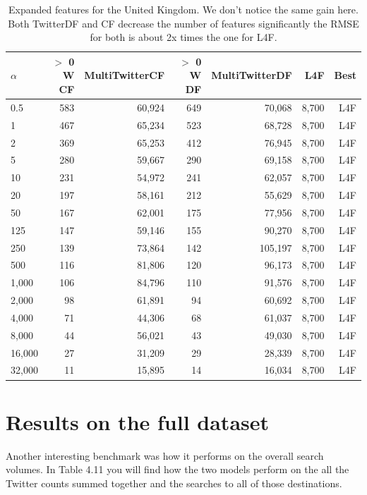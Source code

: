 \documentclass[minf,twoside,singlespacing,parskip,frontabs,notimes,11pt]{infthesis}
\begin{document}
\begin{table}[h]
\begin{center}
\begin{tabular}{ l | r | r | r | r | r | r}
$\alpha$ & $>$ 0 W CF & MultiTwitterCF & $>$ 0 W DF & MultiTwitterDF & L4F & Best\\
\hline
0.5 & 583 & 60,924 & 649 & 70,068 & 8,700 & L4F\\
1 & 467 & 65,234 & 523 & 68,728 & 8,700 & L4F\\
2 & 369 & 65,253 & 412 & 76,945 & 8,700 & L4F\\
5 & 280 & 59,667 & 290 & 69,158 & 8,700 & L4F\\
10 & 231 & 54,972 & 241 & 62,057 & 8,700 & L4F\\
20 & 197 & 58,161 & 212 & 55,629 & 8,700 & L4F\\
50 & 167 & 62,001 & 175 & 77,956 & 8,700 & L4F\\
125 & 147 & 59,146 & 155 & 90,270 & 8,700 & L4F\\
250 & 139 & 73,864 & 142 & 105,197 & 8,700 & L4F\\
500 & 116 & 81,806 & 120 & 96,173 & 8,700 & L4F\\
1,000 & 106 & 84,796 & 110 & 91,576 & 8,700 & L4F\\
2,000 & 98 & 61,891 & 94 & 60,692 & 8,700 & L4F\\
4,000 & 71 & 44,306 & 68 & 61,037 & 8,700 & L4F\\
8,000 & 44 & 56,021 & 43 & 49,030 & 8,700 & L4F\\
16,000 & 27 & 31,209 & 29 & 28,339 & 8,700 & L4F\\
32,000 & 11 & 15,895 & 14 & 16,034 & 8,700 & L4F\\
\end{tabular}
\end{center}
\caption{Expanded features for the United Kingdom. We don't notice the same gain here. Both TwitterDF and CF decrease the number of features significantly the RMSE for both is about 2x times the one for L4F.}
\label{uk}
\end{table}

\newpage
\section{Results on the full dataset}

Another interesting benchmark was how it performs on the overall search volumes. In Table 4.11 you will find how the two models perform on the all the Twitter counts summed together and the searches to all of those destinations.
\end{document}
